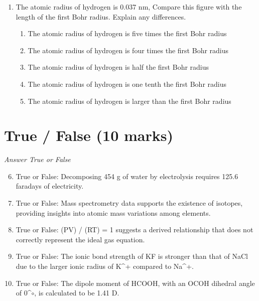 \documentclass[12pt]{article}
\begin{document}
\begin{enumerate}[label=\arabic*.]
\begin{enumerate}[label=(\alph*)]
    \item 20.5 MeV
    \item 21.2 MeV
\end{enumerate}
\item The atomic radius of hydrogen is 0.037 nm, Compare this figure with the length of the first Bohr radius. Explain any differences.
\begin{enumerate}[label=(\alph*)]
    \item The atomic radius of hydrogen is five times the first Bohr radius
    \item The atomic radius of hydrogen is four times the first Bohr radius
    \item The atomic radius of hydrogen is half the first Bohr radius
    \item The atomic radius of hydrogen is one tenth the first Bohr radius
    \item The atomic radius of hydrogen is larger than the first Bohr radius
\end{enumerate}
\end{enumerate}

\section*{True / False (10 marks)}
\textit{Answer True or False}
\begin{enumerate}[label=\arabic*.]
\setcounter{enumi}{5}
\item True or False: Decomposing 454 g of water by electrolysis requires 125.6 faradays of electricity.
\item True or False: Mass spectrometry data supports the existence of isotopes, providing insights into atomic mass variations among elements.
\item True or False: (PV) / (RT) = 1 suggests a derived relationship that does not correctly represent the ideal gas equation.
\item True or False: The ionic bond strength of KF is stronger than that of NaCl due to the larger ionic radius of K^+ compared to Na^+.
\item True or False: The dipole moment of HCOOH, with an OCOH dihedral angle of 0^\ensuremath{\circ}, is calculated to be 1.41 D.
\end{enumerate}
\end{document}
